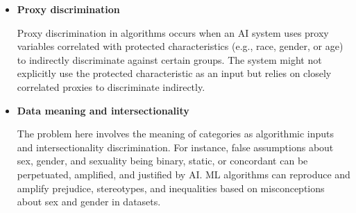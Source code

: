 \begin{itemize}
    \item \textbf{Proxy discrimination}
    
    Proxy discrimination in algorithms occurs when an AI system uses proxy variables correlated with protected characteristics (e.g., race, gender, or age) to indirectly discriminate against certain groups. The system might not explicitly use the protected characteristic as an input but relies on closely correlated proxies to discriminate indirectly.
    
    \item \textbf{Data meaning and intersectionality}
    
    The problem here involves the meaning of categories as algorithmic inputs and intersectionality discrimination. For instance, false assumptions about sex, gender, and sexuality being binary, static, or concordant can be perpetuated, amplified, and justified by AI. ML algorithms can reproduce and amplify prejudice, stereotypes, and inequalities based on misconceptions about sex and gender in datasets.
\end{itemize}

